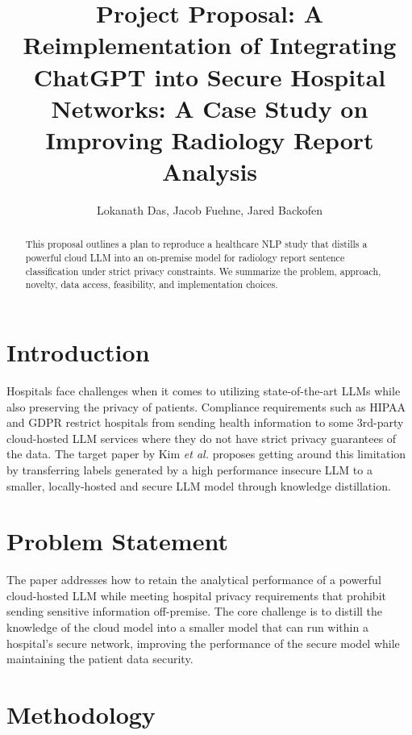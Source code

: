 \documentclass[letterpaper]{article} %
\title{Project Proposal: A Reimplementation of Integrating ChatGPT into Secure Hospital Networks: A Case Study on Improving Radiology Report Analysis }
\author{
  Lokanath Das, Jacob Fuehne, Jared Backofen
}
\begin{document}
\maketitle

\begin{abstract}
This proposal outlines a plan to reproduce a healthcare NLP study that distills a powerful cloud LLM into an on-premise model for radiology report sentence classification under strict privacy constraints. We summarize the problem, approach, novelty, data access, feasibility, and implementation choices.
\end{abstract}

\section{Introduction}
Hospitals face challenges when it comes to utilizing state-of-the-art LLMs while also preserving the privacy of patients. Compliance requirements such as HIPAA and GDPR restrict hospitals from sending health information to some 3rd-party cloud-hosted LLM services where they do not have strict privacy guarantees of the data. The target paper by Kim \textit{et al.} \cite{kim2024chatgpt} proposes getting around this limitation by transferring labels generated by a high performance insecure LLM to a smaller, locally-hosted and secure LLM model through knowledge distillation.

\section{Problem Statement}
The paper addresses how to retain the analytical performance of a powerful cloud-hosted LLM while meeting hospital privacy requirements that prohibit sending sensitive information off-premise. The core challenge is to distill the knowledge of the cloud model into a smaller model that can run within a hospital’s secure network, improving the performance of the secure model while maintaining the patient data security.

\section{Methodology}
\end{document}
